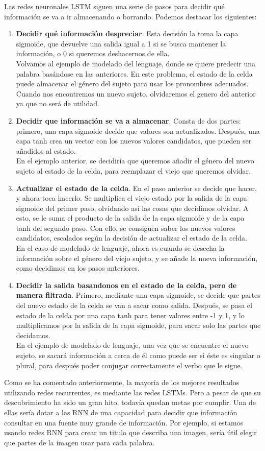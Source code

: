 Las redes neuronales LSTM siguen una serie de pasos para decidir qué información se va a ir almacenando o borrando. Podemos destacar los siguientes:
\begin{enumerate}
\item \textbf{Decidir qué información despreciar}. Esta decisión la toma la capa sigmoide, que devuelve una salida igual a 1 si se busca mantener la información, o 0 si queremos deshacernos de ella.\\
Volvamos al ejemplo de modelado del lenguaje, donde se quiere predecir una palabra basándose en las anteriores. En este problema, el estado de la celda puede almacenar el género del sujeto para usar los pronombres adecuados. Cuando nos encontremos un nuevo sujeto, olvidaremos el genero del anterior ya que no será de utilidad.
\item \textbf{Decidir que información se va a almacenar}. Consta de dos partes: primero, una capa sigmoide decide que valores son actualizados. Después, una capa tanh crea un vector con los nuevos valores candidatos, que pueden ser añadidos al estado.\\
En el ejemplo anterior, se decidiría que queremos añadir el género del nuevo sujeto al estado de la celda, para reemplazar el viejo que queremos olvidar.
\item \textbf{Actualizar el estado de la celda}. En el paso anterior se decide que hacer, y ahora toca hacerlo. Se multiplica el viejo estado por la salida de la capa sigmoide del primer paso, olvidando así las cosas que decidimos olvidar. A esto, se le suma el producto de la salida de la capa sigmoide y de la capa tanh del segundo paso. Con ello, se consiguen saber los nuevos valores candidatos, escalados según la decisión de actualizar el estado de la celda.\\
En el caso de modelado de lenguaje, ahora es cuando se desecha la información sobre el género del viejo sujeto, y se añade la nueva información, como decidimos en los pasos anteriores.
\item \textbf{Decidir la salida basandonos en el estado de la celda, pero de manera filtrada}. Primero, mediante una capa sigmoide, se decide que partes del nuevo estado de la celda se van a sacar como salida. Después, se pasa el estado de la celda por una capa tanh para tener valores entre -1 y 1, y lo multiplicamos por la salida de la capa sigmoide, para sacar solo las partes que decidamos.\\
En el ejemplo de modelado de lenguaje, una vez que se encuentre el nuevo sujeto, se sacará información a cerca de él como puede ser si éste es singular o plural, para después poder conjugar correctamente el verbo que le sigue.
\end{enumerate}
Como se ha comentado anteriormente, la mayoría de los mejores resultados utilizando redes recurrentes, es mediante las redes LSTMs. Pero a pesar de que su descubrimiento ha sido un gran hito, todavía quedan metas por cumplir. Una de ellas sería dotar a las RNN de una capacidad para decidir que información consultar en una fuente muy grande de información. Por ejemplo, si estamos usando redes RNN para crear un titulo que describa una imagen, sería útil elegir que partes de la imagen usar para cada palabra.
\label{ch:teoria}
